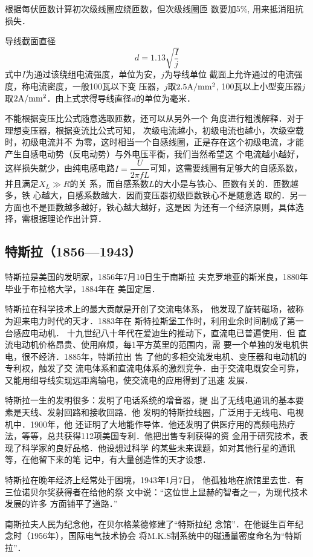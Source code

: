 根据每伏匝数计算初次级线圈应绕匝数，但次级线圈匝
数要加5\%, 用来抵消阻抗损失．

导线截面直径
\[d=1.13\sqrt{\frac{I}{j}}\]
式中$I$为通过该绕组电流强度，单位为安，$j$为导线单位
截面上允许通过的电流强度，称电流密度，一般100瓦以下变
压器，$j$取$2.5{\rm A/mm^2}$, 100瓦以上小型变压器$j$取$2{\rm A/mm^2}$．由上式求得导线直径$d$的单位为毫米．

不能根据变压比公式随意选取匝数，还可以从另外一个
角度进行粗浅解释．对于理想变压器，根据变流比公式可知，
次级电流越小，初级电流也越小，次级空载时，初级电流并不
为零，这时相当一个自感线圈，正是存在这个初级电流，才能
产生自感电动势（反电动势）与外电压平衡，我们当然希望这
个电流越小越好，这样损失就少，由纯电感电路$I=\dfrac{U}{2\pi fL}$可知，这需要线圈有足够大的自感系数，并且满足$X_L\gg R$的关
系，而自感系数$L$的大小是与铁心、匝数有关的．匝数越多，铁
心越大，自感系数越大．因而变压器初级匝数铁心不是随意选
取的．另一方面也不是匝数越多越好，铁心越大越好，这是因
为还有一个经济原则，具体选择，需根据理论作出计算．

\subsection{特斯拉（1856—1943）}

特斯拉是美国的发明家，1856年7月10日生于南斯拉
夫克罗地亚的斯米良，1880年毕业于布拉格大学，1884年在
美国定居．

特斯拉在科学技术上的最大贡献是开创了交流电体系，
他发现了旋转磁场，被称为迎来电力时代的天才．1883年在
斯特拉斯堡工作时，利用业余时间制成了第一台感应电动机．
十九世纪八十年代在爱迪生的推动下，直流电已普遍使用．但
直流电动机价格昂贵、使用麻烦，每1平方英里的范围内，需
要一个单独的发电机供电，很不经济．1885年，特斯拉出 售
了他的多相交流发电机、变压器和电动机的专利权，触发了交
流电体系和直流电体系的激烈竞争．由于交流电既安全可靠，
又能用细导线实现远距离输电，使交流电的应用得到了迅速
发展．

特斯拉一生的发明很多：发明了电话系统的增音器，提
出了无线电通讯的基本要素是天线、发射回路和接收回路．他
发明的特斯拉线圈，广泛用于无线电、电视机中．1900年，他
还证明了大地能作导体．他还发明了供医疗用的高频电热疗
法，等等，总共获得112项美国专利．他把出售专利获得的资
金用于研究技术，表现了科学家的良好品格．他设想过科学
的某些未来课题，如对其他行星的通讯等，在他留下来的笔
记中，有大量创造性的天才设想．

特斯拉在晚年经济上经常处于困境，1943年1月7日，
他孤独地在旅馆里去世．有三位诺贝尔奖获得者在给他的祭
文中说：“这位世上显赫的智者之一，为现代技术发展的许多
方面铺平了道路．”

南斯拉夫人民为纪念他，在贝尔格莱德修建了“特斯拉纪
念馆”．在他诞生百年纪念时（1956年），国际电气技术协会
将M.K.S制系统中的磁通量密度命名为“特斯拉”．













